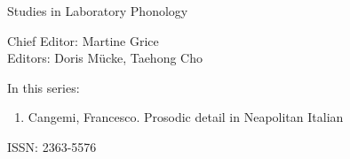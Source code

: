 
{\raggedleft{}}

\bigskip

{\large Studies in Laboratory Phonology}

\bigskip

Chief Editor:  Martine Grice%
\\
Editors:    Doris Mücke, %
    Taehong Cho %

\bigskip

In this series:

\begin{enumerate}
\item Cangemi, Francesco. Prosodic detail in Neapolitan Italian
\end{enumerate}

\vfill

\gdef\lsISSN{2363-5576}%
\hfill ISSN: \lsISSN